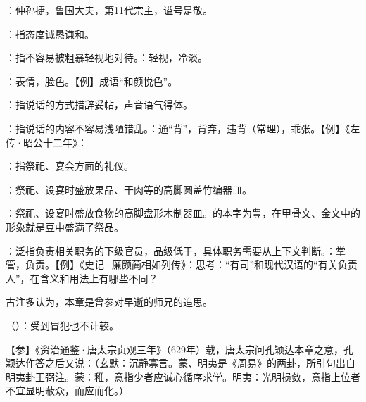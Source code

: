 {
\item {}：仲孙捷，鲁国大夫，第11代宗主，谥号是敬。
\item {}：指态度诚恳谦和。
\item {}：指不容易被粗暴轻视地对待。：轻视，冷淡。
\item {}：表情，脸色。【例】成语“和颜悦色”。
\item {}：指说话的方式措辞妥帖，声音语气得体。
\item {}：指说话的内容不容易浅陋错乱。：通“背”，背弃，违背（常理），乖张。【例】《左传·昭公十二年》：
\item {}：指祭祀、宴会方面的礼仪。

：祭祀、设宴时盛放果品、干肉等的高脚圆盖竹编器皿。%

：祭祀、设宴时盛放食物的高脚盘形木制器皿。的本字为豊，在甲骨文、金文中的形象就是豆中盛满了祭品。

\item {}：泛指负责相关职务的下级官员，品级低于，具体职务需要从上下文判断。：掌管，负责。【例】《史记·廉颇蔺相如列传》：思考：“有司”和现代汉语的“有关负责人”，在含义和用法上有哪些不同？
}
{}


{
古注多认为，本章是曾参对早逝的师兄的追思。
\begin{lyitemize}
\item {}（）：受到冒犯也不计较。
\end{lyitemize}
【参】《资治通鉴·唐太宗贞观三年》（629年）载，唐太宗问孔颖达本章之意，孔颖达作答之后又说：（玄默：沉静寡言。蒙、明夷是《周易》的两卦，所引句出自明夷卦王弼注。蒙：稚，意指少者应诚心循序求学。明夷：光明损敛，意指上位者不宜显明蔽众，而应而化。）
}
{}


